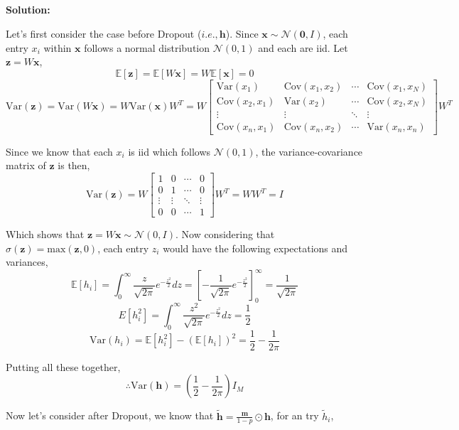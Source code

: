 \documentclass{article}
\newenvironment{solution}
  {\par\noindent\textbf{Solution:}\par}
  {\par}
\begin{document}
\subsection{}
\begin{solution}
  Let's first consider the case before Dropout ($i.e., \textbf{h}$). Since $\textbf{x} \sim \mathcal{N}(\textbf{0}, I)$, 
  each entry $x_i$ within $\textbf{x}$ follows a normal distribution $\mathcal{N}(0,1)$ and each are iid.
  Let $\textbf{z} = W\textbf{x}$,
  $$\mathbb{E}[\textbf{z}] = \mathbb{E}[W\textbf{x}] = W\mathbb{E}[\textbf{x}] = 0$$
  $$\text{Var}(\textbf{z}) = \text{Var}(W\textbf{x}) = W\text{Var}(\textbf{x})W^T = W
  \begin{bmatrix} 
    \text{Var}(x_1) & \text{Cov}(x_1,x_2) & \cdots & \text{Cov}(x_1,x_N) \\ 
    \text{Cov}(x_2,x_1) & \text{Var}(x_2) & \cdots & \text{Cov}(x_2,x_N) \\ 
    \vdots & \vdots & \ddots & \vdots \\ 
    \text{Cov}(x_n,x_1) & \text{Cov}(x_n,x_2) & \cdots & \text{Var}(x_n,x_n) 
  \end{bmatrix}W^T$$

  Since we know that each $x_i$ is iid which follows $\mathcal{N}(0,1)$, the variance-covariance matrix of $\textbf{z}$ is then,
  $$\text{Var}(\textbf{z}) = W
  \begin{bmatrix}
    1 & 0 & \cdots & 0 \\ 
    0 & 1 & \cdots & 0 \\ 
    \vdots & \vdots & \ddots & \vdots \\ 
    0 & 0 & \cdots & 1
  \end{bmatrix}
  W^T = WW^T = I$$

  Which shows that $\textbf{z} = W\textbf{x} \sim \mathcal{N}(0,I)$. Now considering that $\sigma(\textbf{z}) = \text{max}(\textbf{z},0)$, each entry $z_i$ would have the following expectations and variances,
  $$\mathbb{E}[h_i] = \int_0^\infty \frac{z}{\sqrt{2\pi}}e^{-\frac{z^2}{2}}dz = \left[ -\frac{1}{\sqrt{2\pi}}e^{-\frac{z^2}{2}} \right]_0^\infty = \frac{1}{\sqrt{2\pi}}$$
  $$E[h_i^2] = \int_0^\infty \frac{z^2}{\sqrt{2\pi}}e^{-\frac{z^2}{2}}dz = \frac{1}{2}$$
  $$\text{Var}(h_i) = \mathbb{E}[h_i^2] - (\mathbb{E}[h_i])^2 = \frac{1}{2} - \frac{1}{2\pi}$$
  
  Putting all these together,
  $$\therefore \text{Var}(\textbf{h}) = \left(\frac{1}{2}-\frac{1}{2\pi}\right)I_M$$


  Now let's consider after Dropout, we know that $\tilde{\textbf{h}} = \frac{\textbf{m}}{1-p} \odot \textbf{h}$, for an try $\tilde{h}_i$,



\end{solution}
\end{document}
